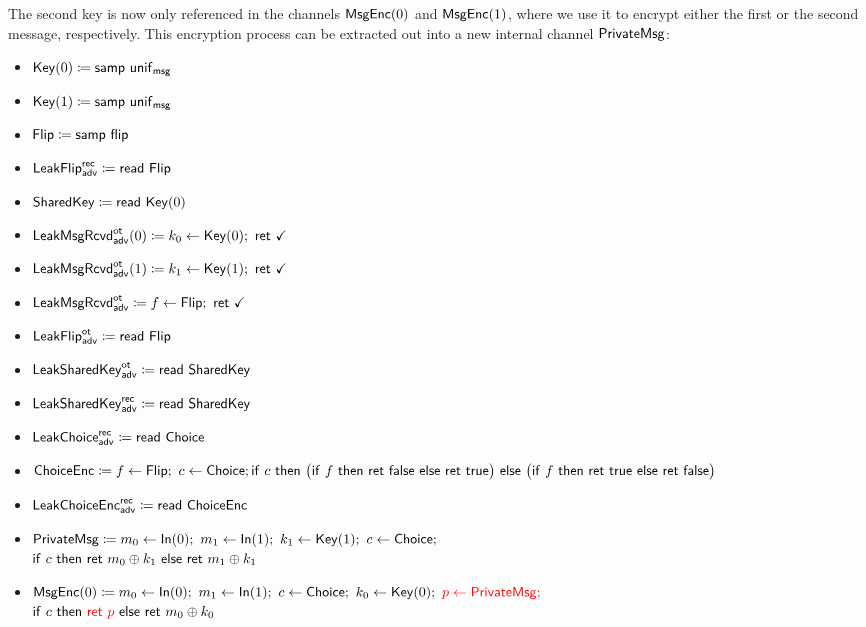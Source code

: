 \noindent The second key is now only referenced in the channels $\mathsf{MsgEnc}(0)$ and $\mathsf{MsgEnc}(1)$, where we use it to encrypt either the first or the second message, respectively. This encryption process can be extracted out into a new internal channel $\mathsf{PrivateMsg}$:

\begin{itemize}
\item $\mathsf{Key}(0) \coloneqq \mathsf{samp} \ \mathsf{unif}_{\mathsf{msg}}$
\item $\mathsf{Key}(1) \coloneqq \mathsf{samp} \ \mathsf{unif}_{\mathsf{msg}}$
\item $\mathsf{Flip} \coloneqq \mathsf{samp} \ \mathsf{flip}$
\item {\color{blue} $\mathsf{LeakFlip}^{\mathsf{rec}}_{\mathsf{adv}} \coloneqq \mathsf{read} \ \mathsf{Flip}$}
\item $\mathsf{SharedKey} \coloneqq \mathsf{read} \ \mathsf{Key}(0)$
\item {\color{blue} $\LeakKeyRcvd^\ot_\adv(0) \coloneqq k_0 \leftarrow \Key(0); \ \ret{\checkmark}$}
\item {\color{blue} $\LeakKeyRcvd^\ot_\adv(1) \coloneqq k_1 \leftarrow \Key(1); \ \ret{\checkmark}$}
\item {\color{blue} $\mathsf{LeakMsgRcvd}^{\mathsf{ot}}_{\mathsf{adv}} \coloneqq f \leftarrow \mathsf{Flip}; \ \mathsf{ret} \ \checkmark$}
\item {\color{blue} $\mathsf{LeakFlip}^{\mathsf{ot}}_{\mathsf{adv}} \coloneqq \mathsf{read} \ \mathsf{Flip}$}
\item {\color{blue} $\mathsf{LeakSharedKey}^{\mathsf{ot}}_{\mathsf{adv}} \coloneqq \mathsf{read} \ \mathsf{SharedKey}$}
\item {\color{blue} $\mathsf{LeakSharedKey}^{\mathsf{rec}}_{\mathsf{adv}} \coloneqq \mathsf{read} \ \mathsf{SharedKey}$}
\item {\color{blue} $\mathsf{LeakChoice}^{\mathsf{rec}}_{\mathsf{adv}} \coloneqq \mathsf{read} \ \mathsf{Choice}$}
\item $\mathsf{ChoiceEnc} \coloneqq f \leftarrow \mathsf{Flip}; \ c \leftarrow \mathsf{Choice}; \\ \mathsf{if} \ c \ \mathsf{then} \ \big(\mathsf{if} \ f \ \mathsf{then} \ \mathsf{ret} \ \mathsf{false} \ \mathsf{else} \ \mathsf{ret} \ \mathsf{true}\big) \ \mathsf{else} \ \big(\mathsf{if} \ f \ \mathsf{then} \ \mathsf{ret} \ \mathsf{true} \ \mathsf{else} \ \mathsf{ret} \ \mathsf{false}\big)$
\item {\color{blue} $\mathsf{LeakChoiceEnc}^{\mathsf{rec}}_{\mathsf{adv}} \coloneqq \mathsf{read} \ \mathsf{ChoiceEnc}$}
\item {\color{red} $\PrivateMsg \coloneqq m_0 \leftarrow \In(0); \ m_1 \leftarrow \In(1); \ k_1 \leftarrow \Key(1); \ c \leftarrow \Choice;$} \\ {\color{red} $\mathsf{if} \ c \ \mathsf{then} \ \mathsf{ret} \ m_0 \oplus k_1 \ \mathsf{else} \ \mathsf{ret} \ m_1 \oplus k_1$}
\item $\mathsf{MsgEnc}(0) \coloneqq m_0 \leftarrow \mathsf{In}(0); \ m_1 \leftarrow \mathsf{In}(1); \ c \leftarrow \mathsf{Choice}; \ k_0 \leftarrow \mathsf{Key}(0); \ {\color{red} p \leftarrow \mathsf{PrivateMsg};}$ \\ $\mathsf{if} \ c \ \mathsf{then} \ {\color{red} \mathsf{ret} \ p} \ \mathsf{else} \ \mathsf{ret} \ m_0 \oplus k_0$

\end{itemize}
